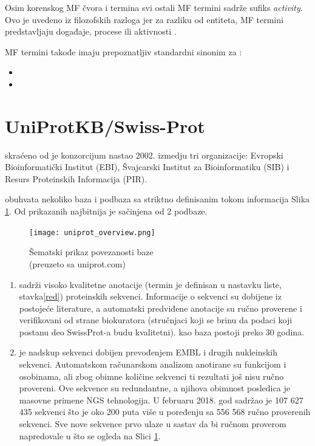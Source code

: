 Osim korenskog MF čvora i  termina svi ostali MF termini sadrže sufiks \textit{activity}.
Ovo je uvedeno iz filozofskih razloga jer za razliku od entiteta, MF termini predstavljaju događaje, procese ili aktivnosti \parencite{go_mf}.

MF termini takođe imaju prepoznatljiv standardni sinonim za  \parencite{go_mf}:
\begin{itemize}
  \item {}
  \item {}
\end{itemize}


\section{UniProtKB/Swiss-Prot}
\label{svis-prot}

\keyword{\uniprot} skraćeno od  je konzorcijum
nastao 2002. izmedju tri organizacije: Evropski Bioinformatički
Institut (EBI), Švajcarski Institut za Bioinformatiku (SIB) i Resurs
Proteinskih Informacija (PIR).  


\uniprot obuhvata nekoliko baza i podbaza sa striktno definisanim tokom
informacija Slika \ref{fig:uniprot_overview}. Od prikazanih najbitnija je
\keyword{\uniprotkb}  sačinjena od 2 podbaze.

\begin{figure}[h!]
  \centering
  \texttt{[image: uniprot\_overview.png]}
  \caption{Šematski prikaz povezanosti \uniprot baze\\ \footnotesize (preuzeto sa uniprot.com)}
  \label{fig:uniprot_overview}
\end{figure}


\begin{enumerate}
  \item \keyword{\swissprot}  sadrži visoko kvalitetne anotacije
     (termin je definisan u nastavku liste,
    stavka\ref{red}) proteinskih sekvenci.  Informacije o sekvenci su dobijene
    iz postojeće literature, a automatski predviđene anotacije su ručno
    proverene i verifikovani od strane biokuratora (stručnjaci koji se brinu da
    podaci koji postanu deo SwissProt-a budu kvalitetni).  \swissprot kao baza
    postoji preko 30 godina.

  \item \trembl {} je nadskup \swissprot sekvenci 
    dobijen prevođenjem EMBL i drugih nukleinskih sekvenci. Automatskom
    računarskom analizom anotirane su funkcijom i osobinama, ali zbog obimne
    količine sekvenci ti rezultati još nisu ručno provereni.  Ove sekvence su
    redundantne, a njihova obimnost posledica je masovne primene NGS
    tehnologija. U februaru 2018. god \trembl sadržao je 107 627 435 sekvenci
    što je oko 200 puta više u poređenju sa 556 568 ručno proverenih \swissprot
    sekvenci. Sve nove sekvence prvo ulaze u sastav \trembl da bi ručnom
    proverom napredovale u \swissprot što se ogleda na Slici
    \ref{fig:uniprot_overview}.
\end{enumerate}





